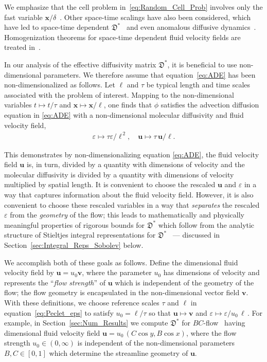 \documentclass[english,12pt,jmp,graphicx]{revtex4-1}
\newcommand{\vecu}{\boldsymbol{u}}
\newcommand{\vecx}{\boldsymbol{x}}
\newcommand{\vecv}{\boldsymbol{v}}
\newcommand{\secref}[1]{Section~\ref{#1}}
\newcommand{\Dg}{\mathfrak{D}}
\begin{document}
We emphasize that the cell problem in~\eqref{eq:Random_Cell_Prob}
involves only the fast variable $\vecx/\delta$~\cite{McLaughlin:SIAM_JAM:780}.  
Other space-time scalings have also been considered, which have led
to space-time dependent $\Dg^*$~\cite{Pavliotis:PHD_Thesis} and even
anomalous diffusive
dynamics~\cite{Majda:Kramer:1999:book}. Homogenization theorems for
space-time dependent fluid velocity fields are treated 
in~\cite{Biferale:PF:2725,Majda:Kramer:1999:book,Pavliotis:PHD_Thesis}.     



In our analysis of the effective diffusivity matrix $\Dg^*$, it is
beneficial to use non-dimensional parameters. We therefore assume 
that equation~\eqref{eq:ADE} has been non-dimensionalized as
follows. Let $\ell$ and $\tau$ be typical length and time scales associated
with the problem of interest. Mapping to the non-dimensional variables
$t\mapsto t/\tau$ and $\vecx\mapsto \vecx/\ell$, one finds that $\phi$ satisfies the
advection diffusion equation in \eqref{eq:ADE} with a non-dimensional
molecular diffusivity and fluid velocity field,
%
\begin{align}\label{eq:Peclet_eps}
  \varepsilon\mapsto\tau\varepsilon/\ell^{\,2},
  \quad
  \vecu\mapsto\tau\,\vecu/\ell.    
\end{align}
%


This demonstrates by non-dimensionalizing equation \eqref{eq:ADE}, the
fluid velocity field $\vecu$ is, in turn, divided by a quantity with dimensions
of velocity and the molecular
diffusivity is divided by a quantity with dimensions of velocity
multiplied by spatial length. It is convenient to choose the rescaled
$\vecu$ and $\varepsilon$ in a way that captures information about the
fluid velocity field. However, it is also convenient to choose
these rescaled variables in a way that \emph{separates} the rescaled
$\varepsilon$ from the \emph{geometry} of the flow; this leads to
mathematically and physically meaningful 
properties of rigorous bounds for $\Dg^*$ which follow from the
analytic structure of Stieltjes integral representations for
$\Dg^*$~\cite{Avellaneda:CMP-339,Baker:1996:Book:Pade} --- discussed in 
\secref{sec:Integral_Reps_Sobolev} below.



We accomplish both of these goals as follows. Define the
dimensional fluid velocity field by $\vecu=u_0\vecv$, where the
parameter $u_0$ has dimensions of velocity and represents the
``\emph{flow strength}'' of $\vecu$ which is independent of the
geometry of the flow; the flow geometry is encapsulated in the
non-dimensional vector field $\vecv$. With these definitions,
we choose reference scales $\tau$ and $\ell$ in
equation~\eqref{eq:Peclet_eps} to satisfy $u_0=\ell/\tau$ so that
$\vecu\mapsto\vecv$ and $\varepsilon\mapsto\varepsilon/u_0\,\ell\,$. For
example, in \secref{sec:Num_Results} we compute $\Dg^*$ for 
$BC$-flow~\cite{Biferale:PF:2725} having dimensional fluid velocity field 
$\vecu=u_0\,(C\cos{y},B\cos{x})$, where the flow strength
$u_0\in(0,\infty)$ is independent of the non-dimensional parameters
$B,C\in[0,1]$ which determine the streamline geometry of
$\vecu$.
\end{document}
